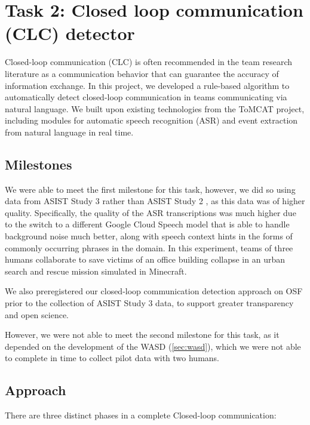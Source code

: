 \section{Task 2: Closed loop communication (CLC) detector}

Closed-loop communication (CLC) is often recommended in the team research
literature as a communication behavior that can guarantee the accuracy of
information exchange. In this project, we developed a rule-based algorithm to
automatically detect closed-loop communication in teams communicating via
natural language.
We built upon existing technologies from the ToMCAT project, including modules
for automatic speech recognition (ASR) and event extraction from natural language in real
time.

\subsection{Milestones}

We were able to meet the first milestone for this task, however, we did so
using data from ASIST Study 3
\cite{huang_freeman_cooke_colonna-romano_wood_buchanan_caufman_2022} rather
than ASIST Study 2
\cite{huang_freeman_cooke_dubrow_colonna-romano_wood_buchanan_caufman_2021}, as
this data was of higher quality. Specifically, the quality of the ASR
transcriptions was much higher due to the switch to a different Google Cloud
Speech model that is able to handle background noise much better, along with
speech context hints in the forms of commonly occurring phrases in the domain.
In this experiment, teams of three humans collaborate to save victims of an
office building collapse in an urban search and rescue mission simulated in
Minecraft.

We also preregistered our closed-loop communication detection approach on OSF
\cite{pyarelal_2022} prior to the collection of ASIST Study 3 data, to support
greater transparency and open science.

However, we were not able to meet the second milestone for this task, as it
depended on the development of the WASD (\autoref{sec:wasd}), which we were not able
to complete in time to collect pilot data with two humans.

\subsection{Approach}

There are three distinct phases in a complete Closed-loop communication:

